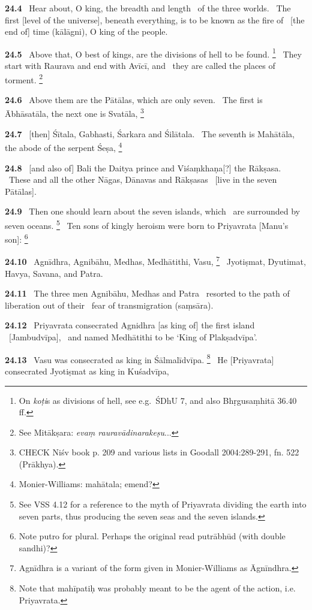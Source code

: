 \documentclass{article}
\newcommand{\skt}[1]{\textit{#1}}
\begin{document}
\textbf{24.4}%
\ Hear about, O king, the breadth and length%
\              of the three worlds.%
\ The first [level of the universe], beneath everything, is to be known as the fire of%
\              [the end of] time (kālāgni), O king of the people.%


\textbf{24.5}%
\ Above that, O best of kings, are the divisions of hell to be found.%
\footnote{On \skt{koṭi}s as divisions of hell, see e.g.\ ŚDhU 7, and also Bhṛgusaṃhitā 36.40 ff. }%
\ They start with Raurava and end with Avīcī, and%
\              they are called the places of torment.%
\footnote{See Mitākṣara: \skt{evaṃ rauravādinarakeṣu}... }%


\textbf{24.6}%
\ Above them are the Pātālas, which are only seven.%
\ The first is Ābhāsatāla, the next one is Svatāla,%
\footnote{CHECK Niśv book p. 209 and various lists in Goodall 2004:289-291, fn. 522 (Prākhya). }%


\textbf{24.7}%
\ [then] Śītala, Gabhasti, Śarkara and Śilātala.%
\ The seventh is Mahātāla, the abode of the serpent Śeṣa,%
\footnote{Monier-Williams: mahātala; emend? }%


\textbf{24.8}%
\ [and also of] Bali the Daitya prince and Viśaṃkhaṇa[?] the Rākṣasa.%
\ These and all the other Nāgas, Dānavas and Rākṣasas%
\              [live in the seven Pātālas].%


\textbf{24.9}%
\ Then one should learn about the seven islands, which%
\              are surrounded by seven oceans.%
\footnote{See VSS 4.12 for a reference to the myth of Priyavrata dividing the earth into seven parts,                thus producing the seven seas and the seven islands. }%
\ Ten sons of kingly heroism were born to Priyavrata [Manu's son]:%
\footnote{Note putro for plural. Perhaps the original read putrābhūd (with double sandhi)? }%


\textbf{24.10}%
\ Agnīdhra, Agnibāhu, Medhas, Medhātithi, Vasu,%
\footnote{Agnīdhra is a variant of the form given in Monier-Williams as Āgnīndhra. }%
\ Jyotiṣmat, Dyutimat, Havya, Savana, and Patra.%


\textbf{24.11}%
\ The three men Agnibāhu, Medhas and Patra%
\ resorted to the path of liberation out of their%
\              fear of transmigration (saṃsāra).%


\textbf{24.12}%
\ Priyavrata consecrated Agnidhra [as king of] the first island%
\              [Jambudvīpa],%
\ and named Medhātithi to be `King of Plakṣadvīpa'.%


\textbf{24.13}%
\ Vasu was consecrated as king in Śālmalīdvīpa.%
\footnote{Note that mahīpatiḥ was probably meant to be the agent of the action, i.e. Priyavrata. }%
\ He [Priyavrata] consecrated Jyotiṣmat as king in Kuśadvīpa,%
\end{document}
